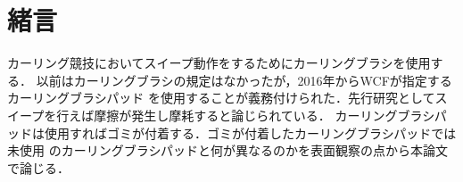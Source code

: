 \documentclass[main]{subfiles}
\begin{document}
\chapter{緒言}
カーリング競技においてスイープ動作をするためにカーリングブラシを使用する．
以前はカーリングブラシの規定はなかったが，2016年からWCFが指定するカーリングブラシパッド
を使用することが義務付けられた．先行研究としてスイープを行えば摩擦が発生し摩耗すると論じられている\cite{ref:maeno2016}．
カーリングブラシパッドは使用すればゴミが付着する．ゴミが付着したカーリングブラシパッドでは未使用
のカーリングブラシパッドと何が異なるのかを表面観察の点から本論文で論じる． 
\end{document}

